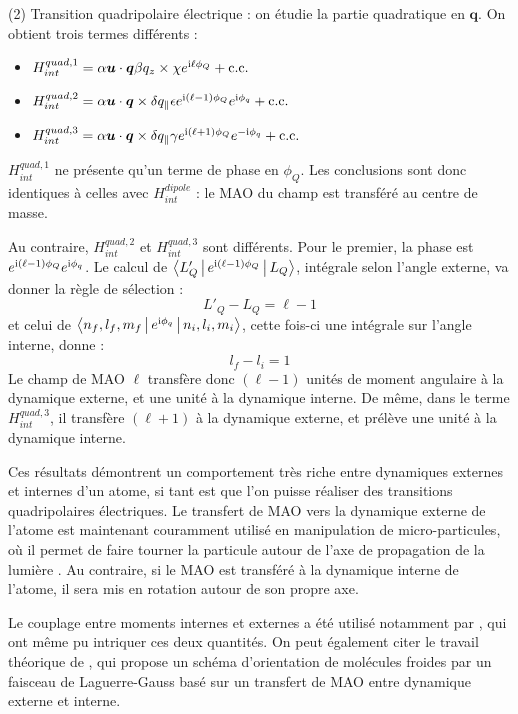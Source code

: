 (2) Transition quadripolaire électrique : on étudie la partie quadratique en $\bm{q}$. On obtient trois termes différents :
\begin{itemize}
\renewcommand{\labelitemi}{$\bullet$}
\setlength\itemsep{1em}
\item $H^{quad,1}_{int} = \alpha\bm{u}\cdot\bm{q}\beta q_z \times\chi e^{\mathrm{i}\ell\phi_Q}+\text{c.c.}$ 
\item $H^{quad,2}_{int} = \alpha\bm{u}\cdot\bm{q} \times \delta q_{\parallel}\epsilon e^{\mathrm{i}(\ell-1)\phi_Q}e^{\mathrm{i} \phi_q}+\text{c.c.}$
\item $H^{quad,3}_{int} = \alpha\bm{u}\cdot\bm{q} \times \delta q_{\parallel}\gamma e^{\mathrm{i}(\ell+1)\phi_Q}e^{-\mathrm{i} \phi_q}+\text{c.c.}$
\end{itemize}


$H^{quad,1}_{int}$ ne présente qu'un terme de phase en $\phi_Q$. Les conclusions sont donc identiques à celles avec $H^{dipole}_{int}$ : le MAO du champ est transféré au centre de masse.\par
Au contraire, $H^{quad,2}_{int}$ et $H^{quad,3}_{int}$ sont différents. Pour le premier, la phase est $e^{\mathrm{i}(\ell-1)\phi_Q}e^{\mathrm{i} \phi_q}$. Le calcul de $\Braket{L'_Q|e^{\mathrm{i}(\ell-1)\phi_Q}|L_Q}$, intégrale selon l'angle externe, va donner la règle de sélection :
\[L'_Q-L_Q=\ell-1\]
et celui de $\Braket{{n_f,l_f,m_f}|e^{\mathrm{i}\phi_q}|n_i,l_i,m_i}$, cette fois-ci une intégrale sur l'angle interne, donne :
\[l_f-l_i = 1\]
Le champ de MAO $\ell$ transfère donc $(\ell-1)$ unités de moment angulaire à la dynamique externe, et une unité à la dynamique interne. De même, dans le terme $H^{quad,3}_{int}$, il transfère $(\ell+1)$ à la dynamique externe, et prélève une unité à la dynamique interne.

Ces résultats démontrent un comportement très riche entre dynamiques externes et internes d'un atome, si tant est que l'on puisse réaliser des transitions quadripolaires électriques. Le transfert de MAO vers la dynamique externe de l'atome est maintenant couramment utilisé en manipulation de micro-particules, où il permet de faire tourner la particule autour de l'axe de propagation de la lumière . Au contraire, si le MAO est transféré à la dynamique interne de l'atome, il sera mis en rotation autour de son propre axe.\par
Le couplage entre moments internes et externes a été utilisé notamment par , qui ont même pu intriquer ces deux quantités. On peut également citer le travail théorique de , qui propose un schéma d'orientation de molécules froides par un faisceau de Laguerre-Gauss basé sur un transfert de MAO entre dynamique externe et interne.

